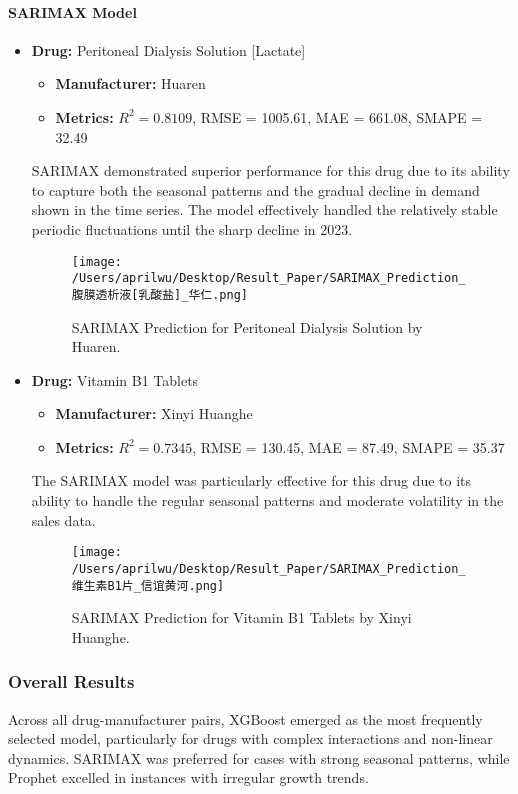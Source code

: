 \documentclass[journal]{IEEEtran}
\begin{document}
\paragraph{SARIMAX Model}
\begin{itemize}
\item \textbf{Drug:} Peritoneal Dialysis Solution [Lactate]
\begin{itemize}
\item \textbf{Manufacturer:} Huaren
\item \textbf{Metrics:} $R^2 = 0.8109$, RMSE = 1005.61, MAE = 661.08, SMAPE = 32.49
\end{itemize}
SARIMAX demonstrated superior performance for this drug due to its ability to capture both the seasonal patterns and the gradual decline in demand shown in the time series. The model effectively handled the relatively stable periodic fluctuations until the sharp decline in 2023.
\begin{figure}[H]
\centering
\texttt{[image: /Users/aprilwu/Desktop/Result\_Paper/SARIMAX\_Prediction\_腹膜透析液[乳酸盐]\_华仁.png]}
\caption{SARIMAX Prediction for Peritoneal Dialysis Solution by Huaren.}
\label{fig:peritoneal}
\end{figure}
\item \textbf{Drug:} Vitamin B1 Tablets
\begin{itemize}
\item \textbf{Manufacturer:} Xinyi Huanghe
\item \textbf{Metrics:} $R^2 = 0.7345$, RMSE = 130.45, MAE = 87.49, SMAPE = 35.37
\end{itemize}
The SARIMAX model was particularly effective for this drug due to its ability to handle the regular seasonal patterns and moderate volatility in the sales data.
\begin{figure}[H]
\centering
\texttt{[image: /Users/aprilwu/Desktop/Result\_Paper/SARIMAX\_Prediction\_维生素B1片\_信谊黄河.png]}
\caption{SARIMAX Prediction for Vitamin B1 Tablets by Xinyi Huanghe.}
\label{fig:vitaminb1}
\end{figure}
\end{itemize}

\subsubsection{Overall Results}

Across all drug-manufacturer pairs, XGBoost emerged as the most frequently selected model, particularly for drugs with complex interactions and non-linear dynamics. SARIMAX was preferred for cases with strong seasonal patterns, while Prophet excelled in instances with irregular growth trends.
\end{document}
